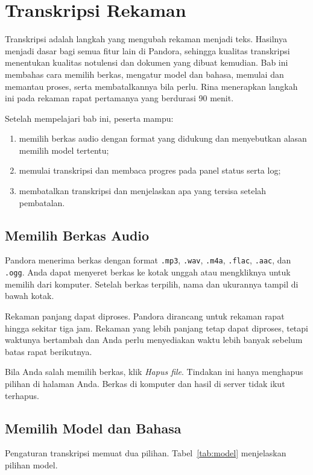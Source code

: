 \chapter{Transkripsi Rekaman}

Transkripsi adalah langkah yang mengubah rekaman menjadi teks. Hasilnya menjadi dasar bagi semua fitur lain di Pandora, sehingga kualitas transkripsi menentukan kualitas notulensi dan dokumen yang dibuat kemudian. Bab ini membahas cara memilih berkas, mengatur model dan bahasa, memulai dan memantau proses, serta membatalkannya bila perlu. Rina menerapkan langkah ini pada rekaman rapat pertamanya yang berdurasi 90 menit.

\begin{indikator}
Setelah mempelajari bab ini, peserta mampu:
\begin{enumerate}
  \item memilih berkas audio dengan format yang didukung dan menyebutkan alasan memilih model tertentu;
  \item memulai transkripsi dan membaca progres pada panel status serta log;
  \item membatalkan transkripsi dan menjelaskan apa yang tersisa setelah pembatalan.
\end{enumerate}
\end{indikator}

\section{Memilih Berkas Audio}
Pandora menerima berkas dengan format \texttt{.mp3}, \texttt{.wav}, \texttt{.m4a}, \texttt{.flac}, \texttt{.aac}, dan \texttt{.ogg}. Anda dapat menyeret berkas ke kotak unggah atau mengkliknya untuk memilih dari komputer. Setelah berkas terpilih, nama dan ukurannya tampil di bawah kotak.

Rekaman panjang dapat diproses. Pandora dirancang untuk rekaman rapat hingga sekitar tiga jam. Rekaman yang lebih panjang tetap dapat diproses, tetapi waktunya bertambah dan Anda perlu menyediakan waktu lebih banyak sebelum batas rapat berikutnya.

Bila Anda salah memilih berkas, klik \emph{Hapus file}. Tindakan ini hanya menghapus pilihan di halaman Anda. Berkas di komputer dan hasil di server tidak ikut terhapus.

\section{Memilih Model dan Bahasa}
Pengaturan transkripsi memuat dua pilihan. Tabel~\ref{tab:model} menjelaskan pilihan model.

